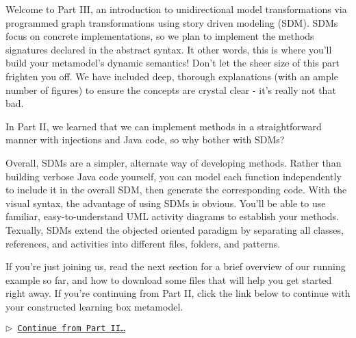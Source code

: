 \genHeader
{}

Welcome to Part III, an introduction to unidirectional model transformations via programmed graph transformations using story driven modeling (SDM).
SDMs focus on concrete implementations, so we plan to implement the methods signatures declared in the abstract syntax. It other words, this is where you'll
build your metamodel's dynamic semantics! Don't let the sheer size of this part frighten you off. We have included deep, thorough explanations (with an ample
number of figures) to ensure the concepts are crystal clear - it's really not that bad.

In Part II, we learned that we can implement methods in a straightforward manner with injections and Java code, so why bother with SDMs? 

Overall, SDMs are a simpler, alternate way of developing methods. Rather than building verbose Java code yourself, you can model each function independently to
include it in the overall SDM, then generate the corresponding code. With the visual syntax, the advantage of using SDMs is obvious. You'll be able to use
familiar, easy-to-understand UML activity diagrams to establish your methods. Texually, SDMs extend the objected oriented paradigm by separating all classes,
references, and activities into different files, folders, and patterns.

If you're just joining us, read the next section for a brief overview of our running example so far, and how to download some files that will help you get
started right away. If you're continuing from Part II, click the link below to continue with your constructed learning box metamodel.

\begin{center}\texttt{$\triangleright$ \hyperlink{explanation}{Continue from Part II\ldots}}\end{center}

